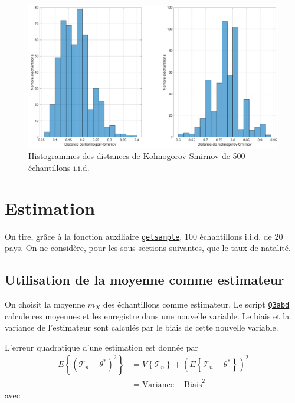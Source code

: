 \documentclass[a4paper, 12pt]{article}
\newcommand{\T}{\mathcal{T}}
\begin{document}
	\begin{figure}[!ht]
	    \centering
	    \includegraphics[width=\textwidth]{resources/pdf/figures/Q2biv.pdf}
	    \caption{Histogrammes des distances de Kolmogorov-Smirnov de 500 échantillons i.i.d.}
	    \label{fig:Q2biv}
	\end{figure}
	
	
	\section{Estimation}
	On tire, grâce à la fonction auxiliaire \hyperref[subsec:code-auxiliary]{\texttt{getsample}}, 100 échantillons i.i.d. de 20 pays. On ne considère, pour les sous-sections suivantes, que le taux de natalité.
	
	\subsection{Utilisation de la moyenne comme estimateur}
	\label{subsec:Q3a}
	On choisit la moyenne \(m_X\) des échantillons comme estimateur. Le script \hyperref[subsec:code-Q3]{\texttt{Q3abd}} calcule ces moyennes et les enregistre dans une nouvelle variable. Le biais et la variance de l'estimateur sont calculés par le biais de cette nouvelle variable.\par
	
	L'erreur quadratique d'une estimation est donnée par
	\begin{align}
	    \label{eq:Q3a}
	    E\left\{\left (\T_n-\theta^*\right )^2\right\} &= V\left\{\T_n\right\} + \left (E\left\{\T_n-\theta^*\right\}\right)^2\\
	    \nonumber&= \text{Variance} + \text{Biais}^2
	\end{align}
	avec
	
\end{document}
